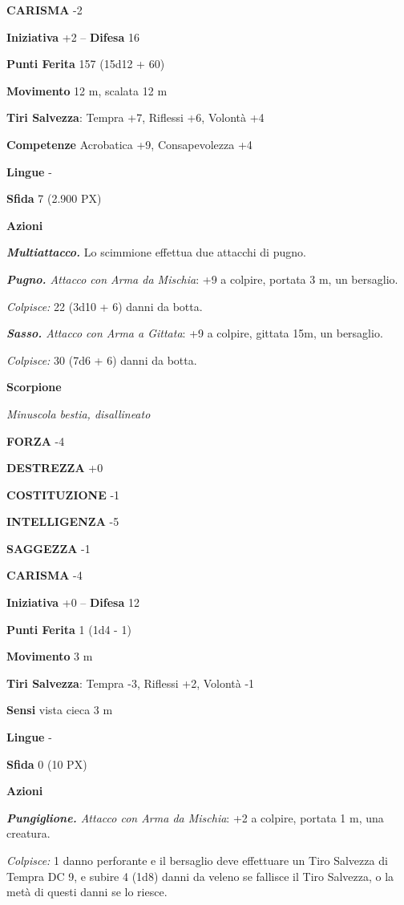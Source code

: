 \begin{multicols}{2}
	\textbf{CARISMA} -2

	\textbf{Iniziativa} +2 -- \textbf{Difesa} 16

	\textbf{Punti Ferita} 157 (15d12 + 60)

	\textbf{Movimento} 12 m, scalata 12 m

	\textbf{Tiri Salvezza}: Tempra +7, Riflessi +6, Volontà +4

	\textbf{Competenze} Acrobatica +9, Consapevolezza +4

	\textbf{Lingue} -

	\textbf{Sfida} 7 (2.900 PX)

	\textbf{Azioni}

	\textit{\textbf{Multiattacco.}} Lo scimmione effettua due attacchi di pugno.

	\textit{\textbf{Pugno.} Attacco con Arma da Mischia}: +9 a colpire, portata 3 m, un bersaglio.

	\textit{Colpisce:} 22 (3d10 + 6) danni da botta.

	\textit{\textbf{Sasso.} Attacco con Arma a Gittata}: +9 a colpire, gittata 15m, un bersaglio.

	\textit{Colpisce:} 30 (7d6 + 6) danni da botta.

	\medskip\textbf{Scorpione}

	\textit{Minuscola bestia, disallineato}

	\textbf{FORZA} -4

	\textbf{DESTREZZA} +0

	\textbf{COSTITUZIONE} -1

	\textbf{INTELLIGENZA} -5

	\textbf{SAGGEZZA} -1

	\textbf{CARISMA} -4

	\textbf{Iniziativa} +0 -- \textbf{Difesa} 12

	\textbf{Punti Ferita} 1 (1d4 - 1)

	\textbf{Movimento} 3 m

	\textbf{Tiri Salvezza}: Tempra -3, Riflessi +2, Volontà -1

	\textbf{Sensi} vista cieca 3 m

	\textbf{Lingue} -

	\textbf{Sfida} 0 (10 PX)

	\textbf{Azioni}

	\textit{\textbf{Pungiglione.} Attacco con Arma da Mischia}: +2 a colpire, portata 1 m, una creatura.

	\textit{Colpisce:} 1 danno perforante e il bersaglio deve effettuare un Tiro Salvezza di Tempra DC 9, e subire 4 (1d8) danni da veleno se fallisce il Tiro Salvezza, o la metà di questi danni se lo riesce.


\end{multicols}
